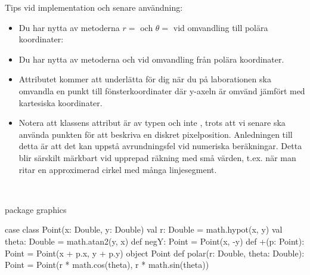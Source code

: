 \noindent Tips vid implementation och senare användning:
\begin{itemize}
\item Du har nytta av metoderna $r = $  och $\theta = $  vid omvandling till polära koordinater:


\item Du har nytta av metoderna  och  vid omvandling från polära koordinater.

\item Attributet  kommer att underlätta för dig när du på laborationen ska omvandla en punkt till fönsterkoordinater där y-axeln är omvänd jämfört med kartesiska koordinater.

\item Notera att klassens attribut är av typen  och inte , trots att vi senare ska använda punkten för att beskriva en diskret pixelposition. Anledningen till detta är att det kan uppstå avrundningsfel vid numeriska beräkningar. Detta blir särskilt märkbart vid upprepad räkning med små värden, t.ex. när man ritar en approximerad cirkel med många linjesegment.
\end{itemize}

\SOLUTION

\TaskSolved \what~
\begin{Code}
package graphics

case class Point(x: Double, y: Double) {
  val r: Double          = math.hypot(x, y)
  val theta: Double      = math.atan2(y, x)
  def negY: Point        = Point(x, -y)
  def +(p: Point): Point = Point(x + p.x, y + p.y)
}
object Point {
  def polar(r: Double, theta: Double): Point =
    Point(r * math.cos(theta), r * math.sin(theta))
}
\end{Code}

